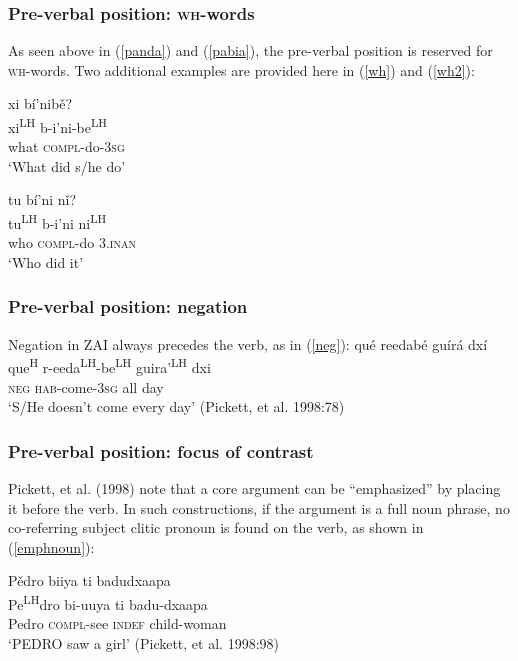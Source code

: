 \subsubsection{Pre-verbal position: \textsc{wh}-words}
As seen above in (\ref{panda}) and (\ref{pabia}), the pre-verbal position is reserved for \textsc{wh}-words. Two additional examples are provided here in (\ref{wh}) and (\ref{wh2}): 

\ea\label{wh}
xi b\'{i}'nib\v{e}? \\
xi\textsuperscript{LH} b-i'ni-be\textsuperscript{LH} \\
what \textsc{compl}-do-3\textsc{sg} \\
\glt `What did s/he do' 
\z

\ea\label{wh2}
tu b\'{i}'ni n\v{i}? \\
tu\textsuperscript{LH} b-i'ni ni\textsuperscript{LH} \\
who \textsc{compl}-do 3.\textsc{inan} \\
\glt `Who did it'  
\z

\subsubsection{Pre-verbal position: negation}
Negation in ZAI always precedes the verb, as in (\ref{neg}):
\ea\label{neg}
\glll qu\'{e} reedab\'{e} gu\'{i}r\'{a} dx\'{i} \\
 que\textsuperscript{H} r-eeda\textsuperscript{LH}-be\textsuperscript{LH} guira'\textsuperscript{LH} dxi \\
\textsc{neg} \textsc{hab}-come-3\textsc{sg} all day \\
\glt `S/He doesn't come every day' \hfill (Pickett, et al. 1998:78)

\z

\subsubsection{Pre-verbal position: focus of contrast}
Pickett, et al. (1998) note that a core argument can be ``emphasized'' by placing it before the verb. In such constructions, if the argument is a full noun phrase, no co-referring subject clitic pronoun is found on the verb, as shown in (\ref{emphnoun}):

\ea\label{emphnoun}
\glll P\v{e}dro biiya ti badudxaapa \\		
Pe\textsuperscript{LH}dro bi-uuya ti badu-dxaapa \\
Pedro \textsc{compl}-see \textsc{indef} child-woman \\
\glt `PEDRO saw a girl' \hfill (Pickett, et al. 1998:98)

